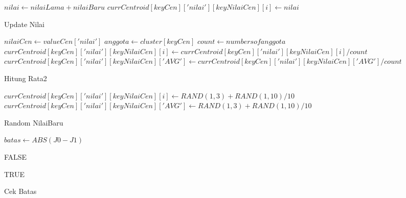 \begin{algorithm}[H]
  \begin{algorithmic}[1]
      \State $nilai \gets nilaiLama+nilaiBaru$
      \State $currCentroid[keyCen]['nilai'][keyNilaiCen][i] \gets nilai$
    \EndProcedure
  \end{algorithmic} 
  \caption{Update Nilai}
  \label{alg:updateNilai}
\end{algorithm}

\begin{algorithm}[H]
  \begin{algorithmic}[1]
            \State $nilaiCen \gets valueCen['nilai']$
            \State $anggota \gets cluster[keyCen]$
            \State $count \gets numbers of anggota$
                        \State $currCentroid[keyCen]['nilai'][keyNilaiCen][i] \gets currCentroid[keyCen]['nilai'][keyNilaiCen][i]/count$
                    \EndFor
                    $currCentroid[keyCen]['nilai'][keyNilaiCen]['AVG'] \gets currCentroid[keyCen]['nilai'][keyNilaiCen]['AVG']/count$
                \EndFor
            \EndIf
        \EndFor
    \EndProcedure
  \end{algorithmic} 
  \caption{Hitung Rata2}
  \label{alg:hitungRata2}
\end{algorithm}

\begin{algorithm}[H]
  \begin{algorithmic}[1]
            \State $currCentroid[keyCen]['nilai'][keyNilaiCen][i] \gets RAND(1,3) + RAND(1,10)/10$
        \EndFor
         \State $currCentroid[keyCen]['nilai'][keyNilaiCen]['AVG'] \gets RAND(1,3) + RAND(1,10)/10$
    \EndProcedure
  \end{algorithmic} 
  \caption{Random NilaiBaru}
  \label{alg:randomNilaiBaru}
\end{algorithm}

\begin{algorithm}[H]
  \begin{algorithmic}[1]
        \State $batas \gets ABS(J0 - J1)$
        
            \State \Return FALSE
        \EndIf
        
        \State \Return TRUE
    \EndProcedure
  \end{algorithmic} 
  \caption{Cek Batas}
  \label{alg:cekBatas}
\end{algorithm}

